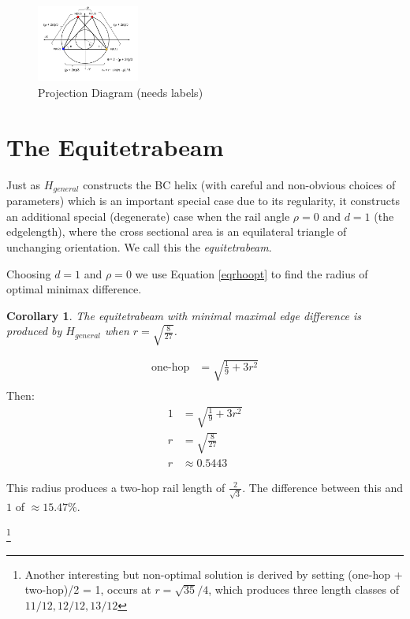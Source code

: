 \documentclass[11pt]{article}
\newtheorem{corollary}{Corollary}
\begin{document}
\begin{figure}[H]
  \label{projectiondiagram}
     \centering
     \includegraphics[width=0.3\textwidth]{figures/ProjectionDiagram.png}
     \caption{Projection Diagram (needs labels)}
\end{figure}


\section{The Equitetrabeam}

Just as $H_{general}$ constructs the BC helix (with careful and non-obvious choices of parameters)
which is an important
special case due to its regularity, it constructs an additional special
(degenerate) case when the rail angle $\rho = 0$
and $d = 1$ (the edgelength), where the cross sectional area is
an equilateral triangle of unchanging orientation.
We call this the \emph{equitetrabeam}.

Choosing $d = 1$ and $\rho = 0$ we use Equation \eqref{eqrhoopt} to find the radius of 
optimal minimax difference.

\begin{corollary}
  The equitetrabeam with minimal maximal edge difference is produced
  by $H_{general}$ when $ r = \sqrt{\frac{8}{27}} $.
  \end{corollary}

\begin{align*}
  \text{one-hop} &= \sqrt{\frac{1}{9} + 3r^2}\\
\end{align*}
Then:
\begin{align*}
   1  &=  \sqrt{\frac{1}{9} + 3r^2} \\
   r  &= \sqrt{\frac{8}{27}} \\
   r &\approx 0.5443
\end{align*}

This radius produces a two-hop rail length of
$\frac{2}{\sqrt{3}}$. The difference between this 
and $1$ of $\approx 15.47\% $.

\footnote{Another interesting but non-optimal solution is derived by setting (one-hop + two-hop)/2 = 1,  occurs at $r = \sqrt{35}/4$,
which produces three length classes of $11/12, 12/12, 13/12$}
\end{document}

